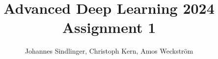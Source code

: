 \documentclass[12pt,a4paper]{article}
\begin{document}
\title{Advanced Deep Learning 2024\\Assignment 1}
\author{Johannes Sindlinger, Christoph Kern, Amos Weckström}
\maketitle




\end{document}
